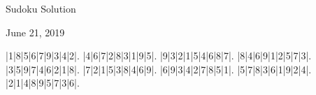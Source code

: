 \documentclass{article}
\begin{document}
\begin{center}
\Huge{Sudoku Solution}
\end{center}
\begin{center}
\Large{June 21, 2019}
\end{center}
\begin{sudoku}
|1|8|5|6|7|9|3|4|2|.
|4|6|7|2|8|3|1|9|5|.
|9|3|2|1|5|4|6|8|7|.
|8|4|6|9|1|2|5|7|3|.
|3|5|9|7|4|6|2|1|8|.
|7|2|1|5|3|8|4|6|9|.
|6|9|3|4|2|7|8|5|1|.
|5|7|8|3|6|1|9|2|4|.
|2|1|4|8|9|5|7|3|6|.
\end{sudoku}
\end{document}

